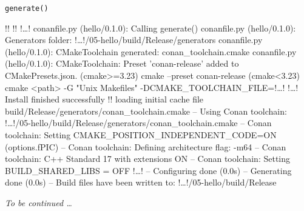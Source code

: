 \documentclass[compress, 8pt, aspectratio=169]{beamer}
\begin{document}
\begin{frame}[fragile]{\texttt{generate()}}

  {\small
  \begin{terminalwindow}[!!][minted options={escapeinside=!!, lastline=11}]
!!
!!
!\dots!
conanfile.py (hello/0.1.0): Calling generate()
conanfile.py (hello/0.1.0): Generators folder: !\dots!/05-hello/build/Release/generators
conanfile.py (hello/0.1.0): CMakeToolchain generated: conan_toolchain.cmake
conanfile.py (hello/0.1.0): CMakeToolchain: Preset 'conan-release' added to CMakePresets.json.
    (cmake>=3.23) cmake --preset conan-release
    (cmake<3.23) cmake <path> -G "Unix Makefiles" -DCMAKE_TOOLCHAIN_FILE=!\dots!
!\dots!
Install finished successfully
!!
loading initial cache file build/Release/generators/conan_toolchain.cmake
-- Using Conan toolchain: !\dots!/05-hello/build/Release/generators/conan_toolchain.cmake
-- Conan toolchain: Setting CMAKE_POSITION_INDEPENDENT_CODE=ON (options.fPIC)
-- Conan toolchain: Defining architecture flag: -m64
-- Conan toolchain: C++ Standard 17 with extensions ON
-- Conan toolchain: Setting BUILD_SHARED_LIBS = OFF
!\dots!
-- Configuring done (0.0s)
-- Generating done (0.0s)
-- Build files have been written to: !\dots!/05-hello/build/Release
  \end{terminalwindow}
  }

  \textit{To be continued \dots}

\end{frame}
\end{document}
